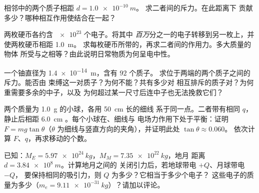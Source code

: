 \begin{exercise}[$\star\star$]\label{exo:g11:fundamental-interactions:10}
相邻中的两个质子相距 $d = \qty{1.0e-10}{m}$。
求二者间的斥力。在此距离下
贡献多少？哪种相互作用使结合在一起？
\end{exercise}

\begin{exercise}[$\star\star$]\label{exo:g11:fundamental-interactions:11}
两枚硬币各约含 $\num{e23}$ 个电子。将其中
\emph{百万}分之一的电子转移到另一枚上，并使两枚硬币相距 \qty{1.0}{m}。
求每枚硬币所带的，再求二者间的作用力。多大质量的物体
所受与之相等？由此说明日常物质为何呈电中性。
\end{exercise}

\begin{exercise}[$\star\star\star$]\label{exo:g11:fundamental-interactions:12}
一个铀直径为 \qty{1.4e-14}{m}，含有 $92$ 个质子。
求位于两端的两个质子之间的斥力。能否由
束缚这一对质子？为何不能？共有多少对
相互排斥的质子对？为何重需要多余的中子，以及
为何超过某一尺寸后连中子也无法挽救它们？
\end{exercise}

\begin{exercise}[$\star\star\star$]\label{exo:g11:fundamental-interactions:13}
两个质量为 \qty{1.0}{g} 的小球，各用 \qty{50}{cm} 长的细线
系于同一点。二者带有相同 $q$，静止后相距 \qty{6.0}{cm}
。每个小球在、细线与
电场力作用下处于平衡：证明 $F = mg\tan\theta$（$\theta$
为细线与竖直方向的夹角），并证明此处 $\tan\theta \approx 0.060$。
依次计算 $F$、$q$，再求移动的个数。
\end{exercise}

\begin{exercise}[$\star\star\star$]\label{exo:g11:fundamental-interactions:14}
已知：$M_E = \qty{5.97e24}{kg}$，$M_M = \qty{7.35e22}{kg}$，地月
距离 $d = \qty{3.84e8}{m}$。计算地月之间的
关闭引力后，若地球带电 $+Q$、月球带电 $-Q$，
要保持相同的吸引力，则 $Q$ 为多少？它相当于多少个电子？
这些电子的质量为多少（$m_e = \qty{9.11e-31}{kg}$）？请加以评论。
\end{exercise}

